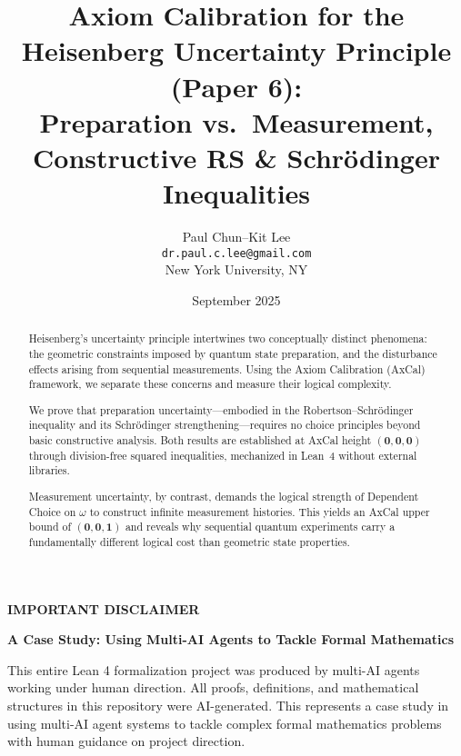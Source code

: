 \documentclass[11pt]{article}
\title{Axiom Calibration for the Heisenberg Uncertainty Principle (Paper 6):\\
Preparation vs.\ Measurement, Constructive RS \& Schrödinger Inequalities}
\author{Paul Chun--Kit Lee\\
\texttt{dr.paul.c.lee@gmail.com}\\
New York University, NY}
\date{September 2025}
\theoremstyle{plain}
\theoremstyle{definition}
\theoremstyle{remark}
\begin{document}
\maketitle

\begin{abstract}
Heisenberg's uncertainty principle intertwines two conceptually distinct phenomena: the geometric constraints imposed by quantum state preparation, and the disturbance effects arising from sequential measurements. Using the Axiom Calibration (AxCal) framework, we separate these concerns and measure their logical complexity.

We prove that preparation uncertainty---embodied in the Robertson--Schrödinger inequality and its Schrödinger strengthening---requires no choice principles beyond basic constructive analysis. Both results are established at AxCal height $(\mathbf{0},\mathbf{0},\mathbf{0})$ through division-free squared inequalities, mechanized in Lean~4 without external libraries.

Measurement uncertainty, by contrast, demands the logical strength of Dependent Choice on $\omega$ to construct infinite measurement histories. This yields an AxCal upper bound of $(\mathbf{0},\mathbf{0},\mathbf{1})$ and reveals why sequential quantum experiments carry a fundamentally different logical cost than geometric state properties.
\end{abstract}

\begin{mdframed}[backgroundcolor=gray!10, linewidth=0pt]
\textbf{IMPORTANT DISCLAIMER}

\textbf{A Case Study: Using Multi-AI Agents to Tackle Formal Mathematics}

This entire Lean 4 formalization project was produced by multi-AI agents working under human direction. All proofs, definitions, and mathematical structures in this repository were AI-generated. This represents a case study in using multi-AI agent systems to tackle complex formal mathematics problems with human guidance on project direction.
\end{mdframed}

\tableofcontents

\noindent{}
\end{document}
